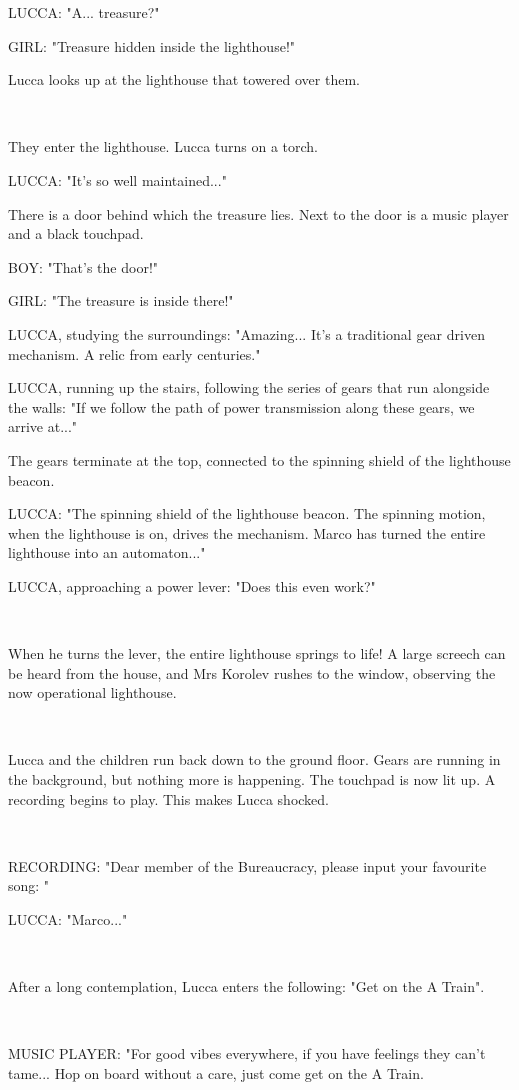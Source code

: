 \documentclass[11pt]{article}
\begin{document}
LUCCA: "A... treasure?"

GIRL: "Treasure hidden inside the lighthouse!"

Lucca looks up at the lighthouse that towered over them.

\ 

They enter the lighthouse.
Lucca turns on a torch. 

LUCCA: "It's so well maintained..."

There is a door behind which the treasure lies.
Next to the door is a music player and a black touchpad.

BOY: "That's the door!"

GIRL: "The treasure is inside there!"

LUCCA, studying the surroundings: "Amazing... It's a traditional gear driven mechanism.
A relic from early centuries."

LUCCA, running up the stairs, following the series of gears that run alongside the walls: "If we follow the path of power transmission along these gears, we arrive at..."

The gears terminate at the top, connected to the spinning shield of the lighthouse beacon.

LUCCA: "The spinning shield of the lighthouse beacon.
The spinning motion, when the lighthouse is on, drives the mechanism.
Marco has turned the entire lighthouse into an automaton..."

LUCCA, approaching a power lever: "Does this even work?"

\ 

When he turns the lever, the entire lighthouse springs to life!
A large screech can be heard from the house, and Mrs Korolev rushes to the window, observing the now operational lighthouse.

\ 

Lucca and the children run back down to the ground floor.
Gears are running in the background, but nothing more is happening.
The touchpad is now lit up.
A recording begins to play. 
This makes Lucca shocked.

\ 

RECORDING: "Dear member of the Bureaucracy, please input your favourite song: "

LUCCA: "Marco..."

\ 

After a long contemplation, Lucca enters the following: "Get on the A Train".

\ 

MUSIC PLAYER: "For good vibes everywhere, if you have feelings they can't tame...
Hop on board without a care, just come get on the A Train.
\end{document}
